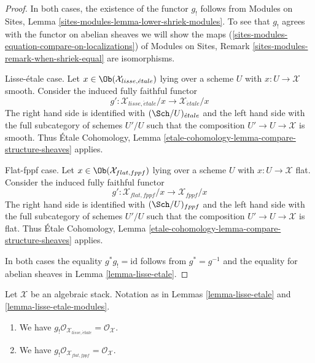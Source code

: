 \begin{proof}
In both cases, the existence of the functor $g_!$ follows from
Modules on Sites, Lemma \ref{sites-modules-lemma-lower-shriek-modules}.
To see that $g_!$ agrees with the functor on abelian sheaves we will
show the maps (\ref{sites-modules-equation-compare-on-localizations}) of
Modules on Sites, Remark \ref{sites-modules-remark-when-shriek-equal}
are isomorphisms.

\medskip\noindent
Lisse-\'etale case. Let $x \in \Ob(\mathcal{X}_{lisse,\acute{e}tale})$
lying over a scheme $U$ with $x : U \to \mathcal{X}$ smooth.
Consider the induced fully faithful functor
$$
g' :
\mathcal{X}_{lisse,\acute{e}tale}/x
\longrightarrow
\mathcal{X}_{\acute{e}tale}/x
$$
The right hand side is identified with $(\Sch/U)_{\acute{e}tale}$ and the
left hand side with the full subcategory of schemes $U'/U$ such that
the composition $U' \to U \to \mathcal{X}$ is smooth. Thus
\'Etale Cohomology, Lemma
\ref{etale-cohomology-lemma-compare-structure-sheaves}
applies.

\medskip\noindent
Flat-fppf case. Let $x \in \Ob(\mathcal{X}_{flat,fppf})$
lying over a scheme $U$ with $x : U \to \mathcal{X}$ flat.
Consider the induced fully faithful functor
$$
g' :
\mathcal{X}_{flat,fppf}/x
\longrightarrow
\mathcal{X}_{fppf}/x
$$
The right hand side is identified with $(\Sch/U)_{fppf}$ and the
left hand side with the full subcategory of schemes $U'/U$ such that
the composition $U' \to U \to \mathcal{X}$ is flat. Thus
\'Etale Cohomology, Lemma
\ref{etale-cohomology-lemma-compare-structure-sheaves}
applies.

\medskip\noindent
In both cases the equality $g^*g_! = \text{id}$ follows from
$g^* = g^{-1}$ and the
equality for abelian sheaves in Lemma \ref{lemma-lisse-etale}.
\end{proof}

\begin{lemma}
\label{lemma-lisse-etale-structure-sheaf}
Let $\mathcal{X}$ be an algebraic stack. Notation as in
Lemmas \ref{lemma-lisse-etale} and \ref{lemma-lisse-etale-modules}.
\begin{enumerate}
\item We have $g_!\mathcal{O}_{\mathcal{X}_{lisse,\acute{e}tale}} =
\mathcal{O}_\mathcal{X}$.
\item We have $g_!\mathcal{O}_{\mathcal{X}_{flat, fppf}} =
\mathcal{O}_\mathcal{X}$.
\end{enumerate}
\end{lemma}


